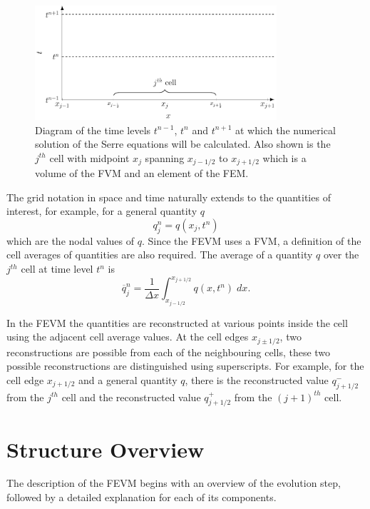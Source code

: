 \begin{figure}
	\centering
	\includegraphics[width=0.8\textwidth]{./chp3/figures/Discretisation.pdf}
	\caption{Diagram of the time levels $t^{n-1}$, $t^n$ and $t^{n+1}$ at which the numerical solution of the Serre equations will be calculated. Also shown is the $j^{th}$ cell with midpoint $x_{j}$ spanning $x_{j-1/2}$ to $x_{j+1/2}$ which is a volume of the FVM and an element of the FEM.}
	\label{fig:NumericalGrid}
\end{figure}

The grid notation in space and time naturally extends to the quantities of interest, for example, for a general quantity $q$
\begin{equation*}
q^n_j = q(x_j ,t^n) 
\end{equation*}
which are the nodal values of $q$. Since the FEVM uses a FVM, a definition of the cell averages of quantities are also required. The average of a quantity $q$ over the $j^{th}$ cell at time level $t^n$ is
\begin{equation*}
\overline{q}_j^n = \frac{1}{\Delta x} \int_{x_{j-1/2}}^{x_{j+1/2}} q(x,t^n) \; dx.
\end{equation*}

In the FEVM the quantities are reconstructed at various points inside the cell using the adjacent cell average values. At the cell edges $x_{j\pm1/2}$, two reconstructions are possible from each of the neighbouring cells, these two possible reconstructions are distinguished using superscripts. For example, for the cell edge $x_{j+1/2}$ and a general quantity $q$, there is the reconstructed value $q^-_{j+1/2}$ from the $j^{th}$ cell and the reconstructed value $q^+_{j+1/2}$ from the $(j+1)^{th}$ cell.

\section{Structure Overview}
\label{sec:StructOverview}
The description of the FEVM begins with an overview of the evolution step, followed by a detailed explanation for each of its components. 

